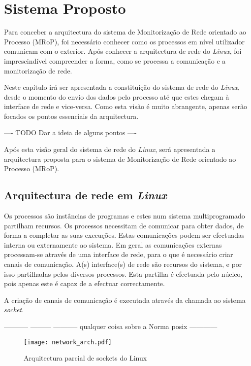 \chapter{Sistema Proposto}
\label{cap:Estrutura}

Para conceber a arquitectura do sistema de Monitorização de Rede orientado ao Processo (MRoP), foi necessário conhecer como os processos em nível utilizador comunicam com o exterior.
Após conhecer a arquitectura de rede do \textit{Linux}, foi imprescindível compreender a forma, como se processa a comunicação e a monitorização de rede.

Neste capítulo irá ser apresentada a constituição do sistema de rede do \textit{Linux}, desde o momento do envio dos dados pelo processo até que estes chegam à interface de rede e vice-versa.
Como esta visão é muito abrangente, apenas serão focados os pontos essenciais da arquitectura. 

---- TODO Dar a ideia de alguns pontos ----

Após esta visão geral do sistema de rede do \textit{Linux}, será apresentada a arquitectura proposta para o sistema de Monitorização de Rede orientado ao Processo (MRoP).



\section{Arquitectura de rede em \textit{Linux}}
\label{sub:network}

Os processos são instâncias de programas e estes num sistema multiprogramado partilham recursos.
Os processos necessitam de comunicar para obter dados, de forma a completar as suas execuções.
Estas comunicações podem ser efectuadas interna ou externamente ao sistema.
Em geral as comunicações externas processam-se através de uma interface de rede, para o que é necessário criar canais de comunicação.
A(s) interface(s) de rede são recursos do sistema, e por isso partilhadas pelos diversos processos.
Esta partilha é efectuada pelo núcleo, pois apenas este é capaz de a efectuar correctamente.

A criação de canais de comunicação é executada através da chamada ao sistema \textit{socket}.

----------- --------- ----------- qualquer coisa sobre a Norma posix ------------

\begin{figure}[htbp]
\centering
\texttt{[image: network\_arch.pdf]} 
\caption{Arquitectura parcial de sockets do Linux}
\label{fig:network_arch}
\end{figure}

